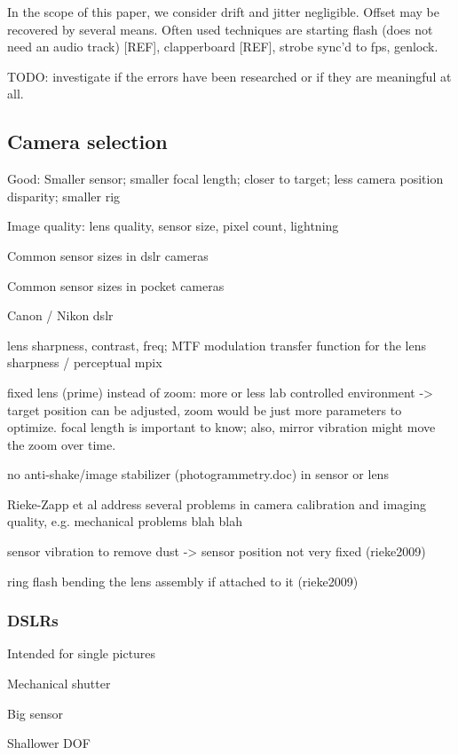In the scope of this paper, we consider drift and jitter negligible.
Offset may be recovered by several means.
Often used techniques are starting flash (does not need an audio track) [REF], clapperboard [REF], strobe sync'd to fps, genlock.

TODO: investigate if the errors have been researched or if they are meaningful at all.


\subsection{Camera selection}

Good: Smaller sensor; smaller focal length; closer to target; less camera position disparity; smaller rig

Image quality: lens quality, sensor size, pixel count, lightning

Common sensor sizes in dslr cameras

Common sensor sizes in pocket cameras

Canon / Nikon dslr


lens sharpness, contrast, freq; MTF modulation transfer function for the lens sharpness / perceptual mpix

fixed lens (prime) instead of zoom: more or less lab controlled environment -> target position can be adjusted, zoom would be just more parameters to optimize. focal length is important to know; also, mirror vibration might move the zoom over time.

no anti-shake/image stabilizer  (photogrammetry.doc) in sensor or lens

Rieke-Zapp et al \cite{rieke2009evaluation} address several problems in camera calibration and imaging quality, e.g. mechanical problems blah blah

sensor vibration to remove dust -> sensor position not very fixed (rieke2009)

ring flash bending the lens assembly if attached to it (rieke2009)

\subsubsection{DSLRs}

Intended for single pictures

Mechanical shutter

Big sensor

Shallower DOF

